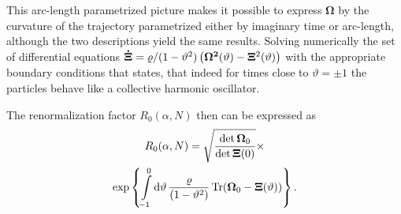 \documentclass[aps, prb, floatfix, twocolumn, notitlepage, superscriptaddress, 10pt]{revtex4-2}
\newcommand{\n}{N}
\newcommand{\1}{{1\hspace*{-0.5ex} \textrm{l} \hspace*{0.5ex}}}
\begin{document}
 This arc-length parametrized picture makes it possible to express $\mathbold{\Omega}$ by the curvature of the trajectory parametrized either by imaginary time or arc-length, although the two descriptions yield the same results. Solving numerically the set of differential equations ${\bf{\dot{\Xi}}} = \varrho /(1 - \vartheta^2)\left({\bf{\Omega}^2}(\vartheta) - {\bf{\Xi}}^2(\vartheta)\right)$ with the appropriate boundary conditions that states, that indeed for times close to $\vartheta = \pm 1$ the particles behave like a collective harmonic oscillator.

The renormalization factor $R_0(\alpha, \n)$ then can be expressed as
\begin{gather}
	R_0(\alpha, \n) = \sqrt{\frac{\det {\bf{\Omega}}_0}{\det {\bf{\Xi}}(0)}}\times\nonumber \\ \exp \left\lbrace \int\limits_{-1}^0 {\rm{d}}\vartheta \, \frac{\varrho}{(1 - \vartheta^2)}\,{\rm{Tr}}( {\bf{\Omega}}_0 -  {\bf{\Xi}}(\vartheta))\right\rbrace.
\end{gather}



\end{document}
